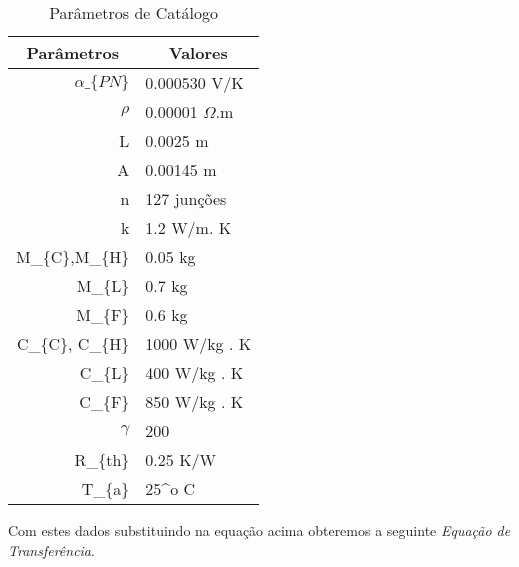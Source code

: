 \begin{table}[H]
\centering
\caption{Parâmetros de Catálogo}
\label{my-label}
\begin{tabular}{|r|l|}
\hline
\multicolumn{1}{|c|}{Parâmetros} & \multicolumn{1}{c|}{Valores} \\ \hline
$\alpha\_\{PN\}$                   & 0.000530 V/K                 \\ \hline
$\rho$                             & 0.00001 $\Omega$.m             \\ \hline
L                                & 0.0025 m                     \\ \hline
A                                & 0.00145 m                    \\ \hline
n                                & 127 junções                  \\ \hline
k                                & 1.2 W/m. K                   \\ \hline
M\_\{C\},M\_\{H\}                & 0.05 kg                      \\ \hline
M\_\{L\}                         & 0.7 kg                       \\ \hline
M\_\{F\}                         & 0.6 kg                       \\ \hline
C\_\{C\}, C\_\{H\}               & 1000 W/kg . K                \\ \hline
C\_\{L\}                         & 400 W/kg . K                 \\ \hline
C\_\{F\}                         & 850 W/kg . K                 \\ \hline
$\gamma$                           & 200                          \\ \hline
R\_\{th\}                        & 0.25 K/W                     \\ \hline
T\_\{a\}                         & 25\textasciicircum o C       \\ \hline
\end{tabular}
\end{table}

Com estes dados substituindo na equação acima obteremos a seguinte \emph{Equação de Transferência}. 


 
